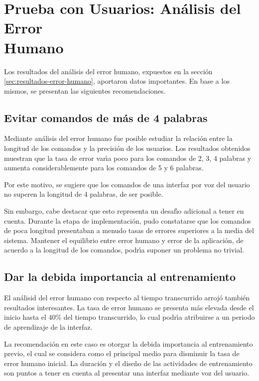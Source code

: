 \section[Prueba con Usuarios: An\'alisis del Error Humano]
{Prueba con Usuarios: An\'alisis del Error \\ Humano}
Los resultados del an\'alisis del error humano, expuestos en la secci\'on \ref{sec:resultados-error-humano},
aportaron datos importantes. En base a los mismos, se presentan las siguientes recomendaciones.

\subsection{Evitar comandos de m\'as de 4 palabras}
Mediante an\'alisis del error humano fue posible estudiar la relaci\'on entre la longitud de los comandos
y la precisi\'on de los usuarios. Los resultados obtenidos muestran que la tasa de error
var{{\'\i}}a poco para los comandos de 2, 3, 4 palabras y aumenta considerablemente para los comandos
de 5 y 6 palabras.

Por este motivo, se sugiere que los comandos de una interfaz por voz del usuario 
no superen la longitud de 4 palabras, de ser posible.

Sin embargo, cabe destacar que esto representa un desaf{{\'\i}}o adicional a tener en cuenta.
Durante la etapa de implementaci\'on, pudo constatarse que los comandos de poca longitud presentaban
a menudo tasas de errores superiores a la media del sistema.
Mantener el equilibrio entre error humano y error de la aplicaci\'on, de acuerdo a la longitud
de los comandos, podr{{\'\i}}a suponer un problema no trivial. 

\subsection{Dar la debida importancia al entrenamiento}
El an\'alisid del error humano con respecto al tiempo transcurrido arroj\'o tambi\'en
resultados interesantes. La tasa de error humano se presenta m\'as elevada desde el inicio hasta
el 40\% del tiempo transcurrido, lo cual podr{{\'\i}}a atribuirse a un periodo de aprendizaje
de la interfaz.

La recomendaci\'on en este caso es otorgar la debida importancia al entrenamiento previo,
el cual se considera como el principal medio para disminuir la tasa de error humano inicial.
La duraci\'on y el dise\~no de las actividades de entrenamiento son puntos a tener en cuenta
al presentar una interfaz mediante voz del usuario.

